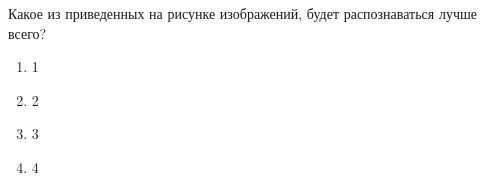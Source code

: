 
Какое из приведенных на рисунке изображений, будет распознаваться лучше всего? 


\begin{enumerate}
    \item 1
    \item 2
    \item 3
    \item 4
\end{enumerate}


